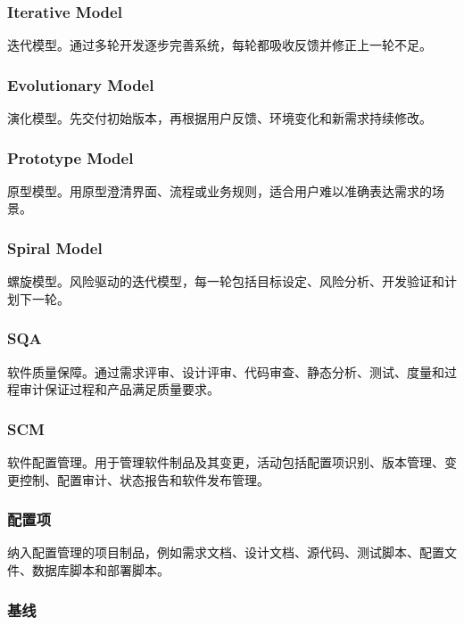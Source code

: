 \documentclass[UTF8,zihao=-4]{ctexart}
\begin{document}
\subsubsection*{Iterative Model}


迭代模型。通过多轮开发逐步完善系统，每轮都吸收反馈并修正上一轮不足。


\subsubsection*{Evolutionary Model}


演化模型。先交付初始版本，再根据用户反馈、环境变化和新需求持续修改。


\subsubsection*{Prototype Model}


原型模型。用原型澄清界面、流程或业务规则，适合用户难以准确表达需求的场景。


\subsubsection*{Spiral Model}


螺旋模型。风险驱动的迭代模型，每一轮包括目标设定、风险分析、开发验证和计划下一轮。


\subsubsection*{SQA}


软件质量保障。通过需求评审、设计评审、代码审查、静态分析、测试、度量和过程审计保证过程和产品满足质量要求。


\subsubsection*{SCM}


软件配置管理。用于管理软件制品及其变更，活动包括配置项识别、版本管理、变更控制、配置审计、状态报告和软件发布管理。


\subsubsection*{配置项}


纳入配置管理的项目制品，例如需求文档、设计文档、源代码、测试脚本、配置文件、数据库脚本和部署脚本。


\subsubsection*{基线}
\end{document}
